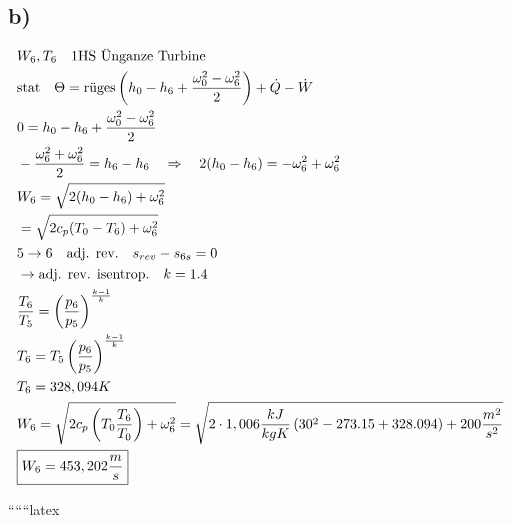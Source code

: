 

\subsection*{b)}

\begin{align*}
    &W_6, T_6 \quad \text{1HS \text{Ü}nganze Turbine} \\
    &\text{stat} \quad \Theta = \text{r\text{ü}ges} \left( h_0 - h_6 + \frac{\omega_0^2 - \omega_6^2}{2} \right) + \dot{Q} - \dot{W} \\
    &0 = h_0 - h_6 + \frac{\omega_0^2 - \omega_6^2}{2} \\
    &- \frac{\omega_6^2 + \omega_6^2}{2} = h_6 - h_6 \quad \Rightarrow \quad 2(h_0 - h_6) = -\omega_6^2 + \omega_6^2 \\
    &W_6 = \sqrt{2(h_0 - h_6) + \omega_6^2} \\
    &= \sqrt{2c_p(T_0 - T_6) + \omega_6^2} \\
    &5 \rightarrow 6 \quad \text{adj. rev.} \quad s_{rev} - s_{6s} = 0 \\
    &\rightarrow \text{adj. rev. isentrop.} \quad k = 1.4 \\
    &\frac{T_6}{T_5} = \left( \frac{p_6}{p_5} \right)^{\frac{k-1}{k}} \\
    &T_6 = T_5 \left( \frac{p_6}{p_5} \right)^{\frac{k-1}{k}} \\
    &T_6 = 328,094 K \\
    &W_6 = \sqrt{2c_p \left( T_0 \frac{T_6}{T_0} \right) + \omega_6^2} = \sqrt{2 \cdot 1,006 \frac{kJ}{kgK} \left( 30^2 - 273.15 + 328.094 \right) + 200 \frac{m^2}{s^2}} \\
    &\boxed{W_6 = 453,202 \frac{m}{s}}
\end{align*}

``````latex